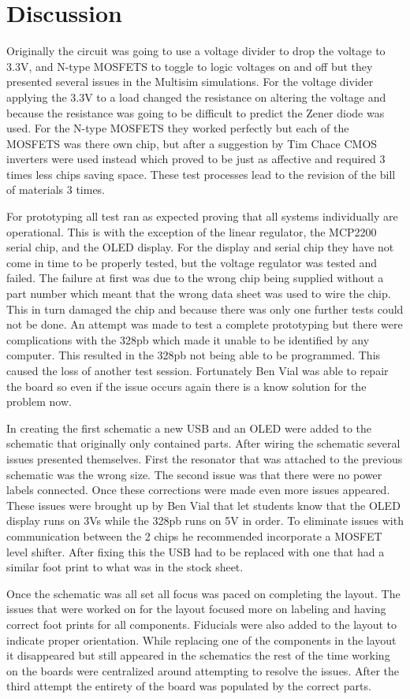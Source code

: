 \documentclass[12pt]{article}
\begin{document}
    \section{Discussion}
    Originally the circuit was going to use a voltage divider to drop the voltage to 3.3V, and N-type MOSFETS to toggle to logic voltages on and off but they presented several issues in the Multisim simulations. For the voltage divider applying the 3.3V to a load changed the resistance on altering the voltage and because the resistance was going to be difficult to predict the Zener diode was used. For the N-type MOSFETS they worked perfectly but each of the MOSFETS was there own chip, but after a suggestion by Tim Chace CMOS inverters were used instead which proved to be just as affective and required 3 times less chips saving space. These test processes lead to the revision of the bill of materials 3 times.
    \par For prototyping all test ran as expected proving that all systems individually are operational. This is with the exception of the linear regulator, the MCP2200 serial chip, and the OLED display.
    For the display and serial chip they have not come in time to be properly tested, but the voltage regulator was tested and failed. The failure at first was due to the wrong chip being supplied without a part number which meant that the wrong data sheet was used to wire the chip. This in turn damaged the chip and because there was only one further tests could not be done. An attempt was made to test a complete prototyping but there were complications with the 328pb which made it unable to be identified by any computer. This resulted in the 328pb not being able to be programmed. This caused the loss of another test session. Fortunately Ben Vial was able to repair the board so even if the issue occurs again there is a know solution for the problem now.
    \par In creating the first schematic a new USB and an OLED were added to the schematic that originally only contained parts. After wiring the schematic several issues presented themselves. First the resonator that was attached to the previous schematic was the wrong size. The second issue was that there were no power labels connected. Once these corrections were made even more issues appeared. These issues were brought up by Ben Vial that let students know that the OLED display runs on 3Vs while the 328pb runs on 5V in order. To eliminate issues with communication between the 2 chips he recommended incorporate a MOSFET level shifter. After fixing this the USB had to be replaced with one that had a similar foot print to what was  in the stock sheet.
    \par Once the schematic was all set all focus was paced on completing the layout. The issues that were worked on for the layout focused more on labeling and having correct foot prints for all components. Fiducials were also added to the layout to indicate proper orientation. While replacing one of the components in the layout it disappeared but still appeared in the schematics the rest of the time working on the boards were centralized around attempting to resolve the issues. After the third attempt the entirety of the board was populated by the correct parts.  
    
\end{document}
